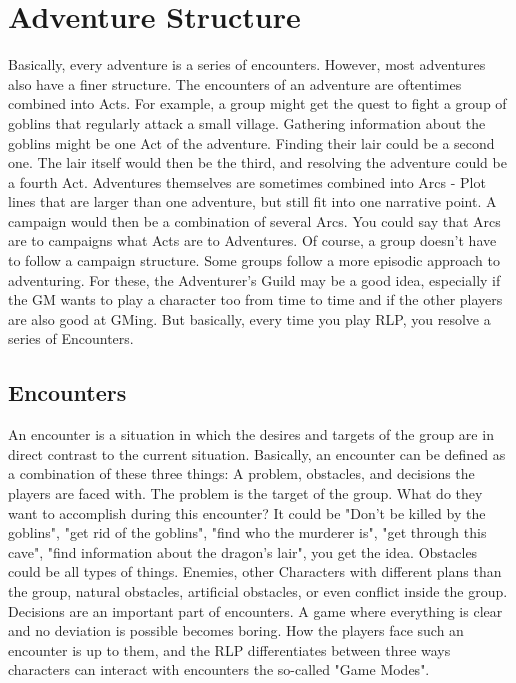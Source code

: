\chapter{Adventure Structure}\label{ch:adventuringStructure}
Basically, every adventure is a series of encounters. 
However, most adventures also have a finer structure. 
The encounters of an adventure are oftentimes combined into Acts. 
For example, a group might get the quest to fight a group of goblins that regularly attack a small village. 
Gathering information about the goblins might be one Act of the adventure. 
Finding their lair could be a second one. 
The lair itself would then be the third, and resolving the adventure could be a fourth Act.
Adventures themselves are sometimes combined into Arcs - Plot lines that are larger than one adventure, but still fit into one narrative point. 
A campaign would then be a combination of several Arcs. 
You could say that Arcs are to campaigns what Acts are to Adventures.
Of course, a group doesn't have to follow a campaign structure. 
Some groups follow a more episodic approach to adventuring. 
For these, the Adventurer's Guild may be a good idea, especially if the GM wants to play a character too from time to time and if the other players are also good at GMing. 
But basically, every time you play RLP, you resolve a series of Encounters.

\section{Encounters}\label{ch:encounters}
An encounter is a situation in which the desires and targets of the group are in direct contrast to the current situation. 
Basically, an encounter can be defined as a combination of these three things: A problem, obstacles, and decisions the players are faced with.
The problem is the target of the group. 
What do they want to accomplish during this encounter? 
It could be "Don't be killed by the goblins", "get rid of the goblins", "find who the murderer is", "get through this cave", "find information about the dragon's lair", you get the idea.
Obstacles could be all types of things. 
Enemies, other Characters with different plans than the group, natural obstacles, artificial obstacles, or even conflict inside the group.
Decisions are an important part of encounters. 
A game where everything is clear and no deviation is possible becomes boring. 
How the players face such an encounter is up to them, and the RLP differentiates between three ways characters can interact with encounters the so-called "Game Modes".

